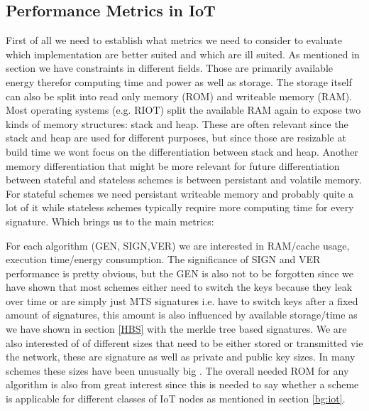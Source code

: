 \documentclass[conference]{IEEEtran}
\newcommand{\comment}[1]{}
\begin{document}
\subsection{Performance Metrics in IoT}
\comment{ %

'' small sized public key, small digital signature and a range of supported hash output sizes is recommended''\cite{QR_Iot_Lattice}

- „signature and/or key sizes to running times and memory consumption to energy consumption „
- „From the software benchmark perspec- tive, the runtime of key generation, signing, and verification processes whereas from the hardware perspective, CPU cycles, key size, signature size, and energy consumption are among the targeted evaluation metrics. In general, the parameter sets are highly dependent on the underlying construction of a particular scheme.“ \cite{QR_sigs}

} %

First of all we need to establish what metrics we need to consider to evaluate which implementation are better suited and which are ill suited.
As mentioned in section \label{bg:iot} we have constraints in different fields. Those are primarily available energy therefor computing time and power as well as storage.
The storage itself can also be split into read only memory (ROM) and writeable memory (RAM).
Most operating systems (e.g. RIOT) split the available RAM again to expose two kinds of memory structures: stack and heap. These are often relevant since the stack and heap are used for different purposes, but since those are resizable at build time we wont focus on the differentiation between stack and heap.
Another memory differentiation that might be more relevant for future differentiation between stateful and stateless schemes is between persistant and volatile memory. 
For stateful schemes we need persistant writeable memory and probably quite a lot of it while stateless schemes typically require more computing time for every signature. Which brings us to the main metrics:

For each algorithm (GEN, SIGN,VER) we are interested in RAM/cache usage, execution time/energy consumption.
The significance of SIGN and VER performance is pretty obvious, but the GEN is also not to be forgotten since we have shown that most schemes either need to switch the keys because they leak over time or are simply just MTS signatures i.e. have to switch keys after a fixed amount of signatures, this amount is also influenced by available storage/time as we have shown in section \ref{HBS} with the merkle tree based signatures.
We are also interested of of different sizes that need to be either stored or transmitted vie the network, these are signature as well as private and public key sizes. In many schemes these sizes have been unusually big \cite{QR_comparison}.
The overall needed ROM for any algorithm is also from great interest since this is needed to say whether a scheme is applicable for different classes of IoT nodes as mentioned in section \ref{bg:iot}.
\end{document}
